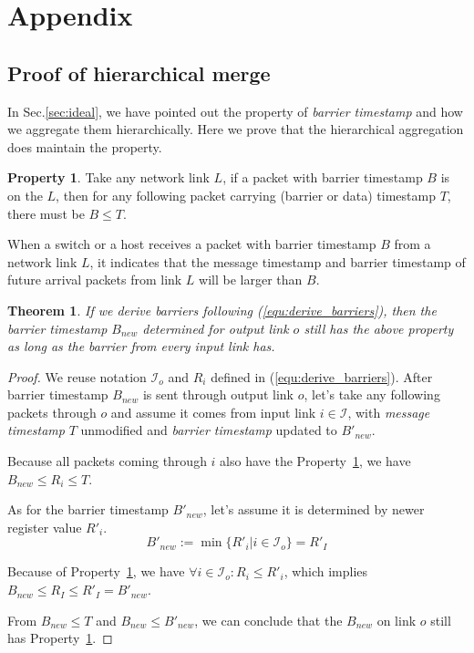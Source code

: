 \section{Appendix}
\label{appx:proof}
\newtheorem{theorem}{Theorem}
\theoremstyle{definition}
\newtheorem{definition}{Definition}
\newtheorem{property}{Property}
\newtheorem*{assump}{Assumption}
\newtheorem*{notation}{Notation}
\newtheorem{lemma}{Lemma}
\theoremstyle{remark}
\newtheorem*{rem}{Remark}
\newtheorem*{conclusion}{Conclusion}
\newtheorem*{note}{Note}
\subsection{Proof of hierarchical merge}
\label{appx:hierarchical_merge}
In Sec.\ref{sec:ideal}, we have pointed out the property of \textit{barrier timestamp} and how we aggregate them hierarchically.
Here we prove that the hierarchical aggregation does maintain the property.
\begin{property}\label{prop:barrier}
	Take any network link $L$, if a packet with barrier timestamp $B$ is on the $L$, then for any following packet carrying (barrier or data) timestamp $T$, there must be $B \le T$.
	
	When a switch or a host receives a packet with barrier timestamp $B$ from a network link $L$, it indicates that the message timestamp and barrier timestamp of future arrival packets from link $L$ will be larger than $B$.
\end{property}
\begin{theorem}
	If we derive barriers following (\ref{equ:derive_barriers}), then the barrier timestamp $B_{new}$ determined for output link $o$ still has the above property as long as the barrier from every input link has.
\end{theorem}
\begin{proof}
	We reuse notation $\mathcal{I}_o$ and $R_i$ defined in (\ref{equ:derive_barriers}).
	After barrier timestamp $B_{new}$ is sent through output link $o$, let's take  any following packets through $o$ and assume it comes from input link $i \in \mathcal{I}$, with \textit{message timestamp} $T$ unmodified and \textit{barrier timestamp} updated to $B'_{new}$.
	
	Because all packets coming through $i$ also have the Property~\ref{prop:barrier}, we have $B_{new} \le R_i \le T$.
	
	As for the barrier timestamp $B'_{new}$, let's assume it is determined by newer register value $R'_i$.
	$$B'_{new} := \min\{R'_i|i \in \mathcal{I}_o\} = R'_I$$
	
	Because of Property~\ref{prop:barrier}, we have $\forall i \in \mathcal{I}_o:R_i \le R'_i$, which implies $B_{new} \le R_I \le R'_I = B'_{new}$.

	From $B_{new} \le T$ and $B_{new} \le B'_{new}$, we can conclude that the $B_{new}$ on link $o$ still has Property~\ref{prop:barrier}.
\end{proof}

